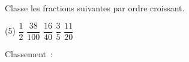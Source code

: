 %
%
Classe les fractions suivantes par ordre croissant.
  \begin{tasks}[label=](5)
    \task $\dfrac{1}{2}$
    \task $\dfrac{38}{100}$
    \task $\dfrac{16}{40}$
    \task $\dfrac{3}{5}$
    \task $\dfrac{11}{20}$
  \end{tasks}
  Classement~:

